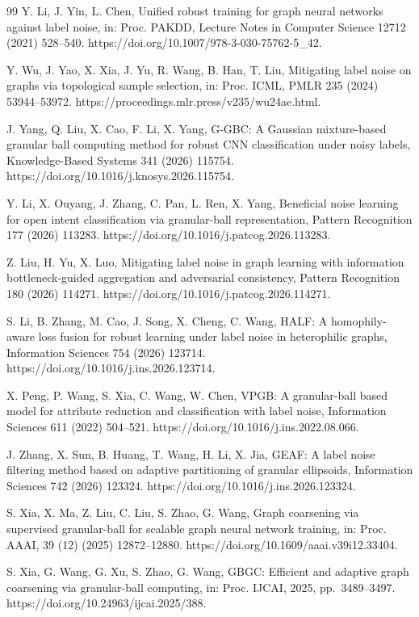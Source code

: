 \begin{thebibliography}{99}
Y. Li, J. Yin, L. Chen, Unified robust training for graph neural networks against label noise, in: Proc. PAKDD, Lecture Notes in Computer Science 12712 (2021) 528--540. https://doi.org/10.1007/978-3-030-75762-5\_42.

Y. Wu, J. Yao, X. Xia, J. Yu, R. Wang, B. Han, T. Liu, Mitigating label noise on graphs via topological sample selection, in: Proc. ICML, PMLR 235 (2024) 53944--53972. https://proceedings.mlr.press/v235/wu24ae.html.

J. Yang, Q. Liu, X. Cao, F. Li, X. Yang, G-GBC: A Gaussian mixture-based granular ball computing method for robust CNN classification under noisy labels, Knowledge-Based Systems 341 (2026) 115754. https://doi.org/10.1016/j.knosys.2026.115754.

Y. Li, X. Ouyang, J. Zhang, C. Pan, L. Ren, X. Yang, Beneficial noise learning for open intent classification via granular-ball representation, Pattern Recognition 177 (2026) 113283. https://doi.org/10.1016/j.patcog.2026.113283.

Z. Liu, H. Yu, X. Luo, Mitigating label noise in graph learning with information bottleneck-guided aggregation and adversarial consistency, Pattern Recognition 180 (2026) 114271. https://doi.org/10.1016/j.patcog.2026.114271.

S. Li, B. Zhang, M. Cao, J. Song, X. Cheng, C. Wang, HALF: A homophily-aware loss fusion for robust learning under label noise in heterophilic graphs, Information Sciences 754 (2026) 123714. https://doi.org/10.1016/j.ins.2026.123714.

X. Peng, P. Wang, S. Xia, C. Wang, W. Chen, VPGB: A granular-ball based model for attribute reduction and classification with label noise, Information Sciences 611 (2022) 504--521. https://doi.org/10.1016/j.ins.2022.08.066.

J. Zhang, X. Sun, B. Huang, T. Wang, H. Li, X. Jia, GEAF: A label noise filtering method based on adaptive partitioning of granular ellipsoids, Information Sciences 742 (2026) 123324. https://doi.org/10.1016/j.ins.2026.123324.

S. Xia, X. Ma, Z. Liu, C. Liu, S. Zhao, G. Wang, Graph coarsening via supervised granular-ball for scalable graph neural network training, in: Proc. AAAI, 39 (12) (2025) 12872--12880. https://doi.org/10.1609/aaai.v39i12.33404.

S. Xia, G. Wang, G. Xu, S. Zhao, G. Wang, GBGC: Efficient and adaptive graph coarsening via granular-ball computing, in: Proc. IJCAI, 2025, pp.~3489--3497. https://doi.org/10.24963/ijcai.2025/388.


\end{thebibliography}
